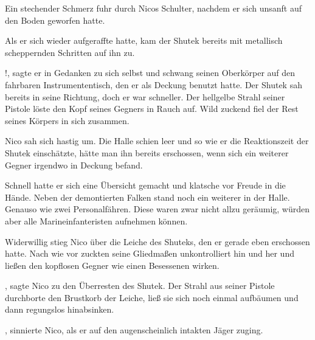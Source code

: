 \par

Ein stechender Schmerz fuhr durch Nicos Schulter, nachdem er sich unsanft auf den Boden geworfen hatte.

\par

Als er sich wieder aufgeraffte hatte, kam der Shutek bereits mit metallisch scheppernden Schritten auf ihn zu.

\par

!, sagte er in Gedanken zu sich selbst und schwang seinen Oberkörper auf den fahrbaren Instrumententisch, den er als Deckung benutzt hatte. Der Shutek sah bereits in seine Richtung, doch er war schneller. Der hellgelbe Strahl seiner Pistole löste den Kopf seines Gegners in Rauch auf. Wild zuckend fiel der Rest seines Körpers in sich zusammen.

\par

Nico sah sich hastig um. Die Halle schien leer und so wie er die Reaktionszeit der Shutek einschätzte, hätte man ihn bereits erschossen, wenn sich ein weiterer Gegner irgendwo in Deckung befand.

\par

Schnell hatte er sich eine Übersicht gemacht und klatsche vor Freude in die Hände. Neben der demontierten Falken stand noch ein weiterer in der Halle. Genauso wie zwei Personalfähren. Diese waren zwar nicht allzu geräumig, würden aber alle Marineinfanteristen aufnehmen können.

\par

Widerwillig stieg Nico über die Leiche des Shuteks, den er gerade eben erschossen hatte. Nach wie vor zuckten seine Gliedmaßen unkontrolliert hin und her und ließen den kopflosen Gegner wie einen Besessenen wirken.

\par

, sagte Nico zu den Überresten des Shutek.  Der Strahl aus seiner Pistole durchborte den Brustkorb der Leiche, ließ sie sich noch einmal aufbäumen und dann regungslos hinabsinken.

\par

, sinnierte Nico, als er auf den augenscheinlich intakten Jäger zuging.

